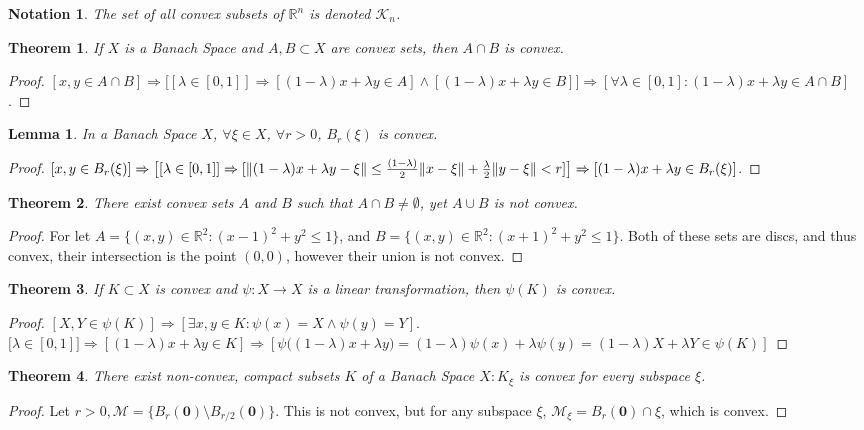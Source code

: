\documentclass[oneside]{book}
\theoremstyle{mystyle}
\newtheorem{theorem}{Theorem}[section]
\newtheorem{lemma}{Lemma}[section]
\newtheorem{notation}{Notation}[section]
\DeclarePairedDelimiter\norm{\lVert}{\rVert}
\begin{document}
\begin{notation}
The set of all convex subsets of $\mathbb{R}^n$ is denoted $\mathscr{K}_n$.
\end{notation}

\begin{theorem}
If $X$ is a Banach Space and $A,B\subset X$ are convex sets, then $A\cap B$ is convex.
\end{theorem}
\begin{proof}
$[x,y \in A\cap B] \Rightarrow \big[[\lambda \in [0,1]]\Rightarrow[ (1-\lambda)x+\lambda y \in A]\land [ (1-\lambda)x+\lambda y \in B]\big] \Rightarrow [\forall \lambda \in [0,1]:(1-\lambda)x+\lambda y \in A\cap B]$. 
\end{proof}

\begin{lemma}
In a Banach Space $X$, $\forall \xi \in X$, $\forall r>0$, $B_{r}(\xi)$ is convex.
\end{lemma}
\begin{proof}
$[x,y\in B_{r}(\xi)]\Rightarrow\big[[\lambda \in [0,1]]\Rightarrow [\norm{(1-\lambda)x+\lambda y-\xi}\leq \frac{(1-\lambda)}{2}\norm{x-\xi}+\frac{\lambda}{2} \norm{y-\xi}< r]\big]\Rightarrow [(1-\lambda)x+\lambda y \in B_{r}(\xi)]$.
\end{proof}

\begin{theorem}
There exist convex sets $A$ and $B$ such that $A\cap B \ne \emptyset$, yet $A\cup B$ is not convex.
\end{theorem}
\begin{proof}
For let $A = \{(x,y)\in \mathbb{R}^2: (x-1)^2+y^2\leq 1\}$, and $B = \{(x,y)\in \mathbb{R}^2:(x+1)^2+y^2\leq 1\}$. Both of these sets are discs, and thus convex, their intersection is the point $(0,0)$, however their union is not convex.
\end{proof}

\begin{theorem}
If $K\subset X$ is convex and $\psi:X\rightarrow X$ is a linear transformation, then $\psi(K)$ is convex.
\end{theorem}
\begin{proof}
$[X,Y\in \psi(K)]\Rightarrow [\exists x,y\in K:\psi(x)=X\land \psi(y)=Y]$. $\big[\lambda \in [0,1]\big]\Rightarrow [(1-\lambda)x+\lambda y\in K]\Rightarrow [\psi\big((1-\lambda)x+\lambda y\big)=(1-\lambda)\psi(x)+\lambda\psi(y) = (1-\lambda)X+\lambda Y \in \psi(K)]$
\end{proof}

\begin{theorem}
There exist non-convex, compact subsets $K$ of a Banach Space $X: K_{\xi}$ is convex for every subspace $\xi$.
\end{theorem}
\begin{proof}
Let $r>0, \mathcal{M} = \{B_{r}(\mathbf{0})\setminus B_{r/2}(\mathbf{0})\}$. This is not convex, but for any subspace $\xi$, $\mathcal{M}_{\xi} = B_{r}(\mathbf{0})\cap \xi$, which is convex.
\end{proof}
\end{document}
